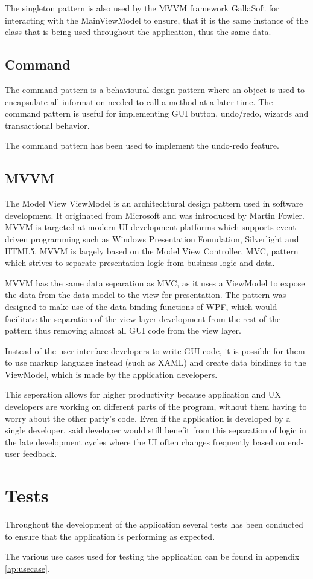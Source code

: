 The singleton pattern is also used by the MVVM framework GallaSoft for interacting with the \textsf{MainViewModel} to ensure, that it is the same instance of the class that is being used throughout the application, thus the same data.

\subsection{Command}
The command pattern is a behavioural design pattern where an object is used to encapsulate all information needed to call a method at a later time.
The command pattern is useful for implementing GUI button, undo/redo, wizards and transactional behavior.

The command pattern has been used to implement the undo-redo feature.

\subsection{MVVM}
The Model View ViewModel is an architechtural design pattern used in software development. It originated from Microsoft and was introduced by Martin Fowler.
MVVM is targeted at modern UI development platforms which supports event-driven programming such as Windows Presentation Foundation, Silverlight and HTML5.
MVVM is largely based on the Model View Controller, MVC, pattern which strives to separate presentation logic from business logic and data.

MVVM has the same data separation as MVC, as it uses a ViewModel to expose the data from the data model to the view for presentation.
The pattern was designed to make use of the data binding functions of WPF, which would facilitate the separation of the view layer development
from the rest of the pattern thus removing almost all GUI code from the view layer.

Instead of the user interface developers to write GUI code, it is possible for them to use markup language instead (such as XAML)
and create data bindings to the ViewModel, which is made by the application developers.

This seperation allows for higher productivity because application and UX developers are working on different parts of the program, 
without them having to worry about the other party's code.
Even if the application is developed by a single developer, said developer would still benefit from this separation of logic 
in the late development cycles where the UI often changes frequently based on end-user feedback.

\section{Tests}
\label{sec:tests}
Throughout the development of the application several tests has been conducted to ensure that the application is performing as expected.

The various use cases used for testing the application can be found in appendix \ref{ap:usecase}.